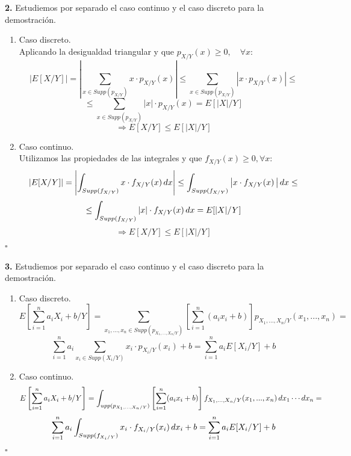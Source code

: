 \documentclass[fleqn]{article}
\newcommand*{\QED}{\hfill\ensuremath{\square}}
\begin{document}
    \textbf{2. } Estudiemos por separado el caso continuo y el caso discreto para la demostración.

    \begin{enumerate}
        \item Caso discreto. \\
                Aplicando la desigualdad triangular y que $p_{X/Y}(x) \geq 0, \quad \forall x:$
                $$\left| E[X/Y] \right| = \left| \sum_{x\in Supp(p_{X/Y})} x\cdot p_{X/Y}(x) \right| \leq   \sum_{x\in Supp(p_{X/Y})} \left| x\cdot p_{X/Y}(x) \right| \leq $$
                $$\leq \sum_{x\in Supp(p_{X/Y})} \left| x \right| \cdot p_{X/Y}(x) = E[|X|/Y]$$
                $$\Rightarrow E[X/Y] \leq E[|X|/Y]$$
        \item Caso continuo. \\
                Utilizamos las propiedades de las integrales y que $f_{X/Y}(x)\geq 0, \forall x :$
                $$\left| E[X/Y] \right| = \left| \int_{Supp(f_{X/Y})} x\cdot f_{X/Y}(x) \thinspace dx \right| \leq  \int_{Supp(f_{X/Y})} \left|x\cdot f_{X/Y}(x) \thinspace \right|dx  \leq$$
                $$\leq \int_{Supp(f_{X/Y})} \left| x \right|\cdot f_{X/Y}(x) \thinspace dx = E[|X|/Y]$$
                $$\Rightarrow E[X/Y] \leq E[|X|/Y]$$
    \end{enumerate}
    \QED \\ \\



    \textbf{3. } Estudiemos por separado el caso continuo y el caso discreto para la demostración.

    \begin{enumerate}
        \item Caso discreto. \\
                $$E\left[\sum_{i=1}^n a_iX_i +b /Y\right] = \sum_{x_1, ..., x_n \in Supp(p_{X_1,...,X_n/Y})} \left[\sum_{i=1}^n (a_ix_i + b)\right]p_{X_1,...,X_n/Y}(x_1,...,x_n) = $$
                $$\sum_{i=1}^n a_i \sum_{x_i \in Supp(X_i/Y)} x_i \cdot p_{X_i/Y}(x_i) + b = \sum_{i=1}^n a_i E[X_i/Y] +b$$
        \item Caso continuo. \\
                $$E\left[\sum_{i=1}^n a_iX_i +b /Y\right] = \int_{ upp(p_{X_1,...,X_n/Y})} \left[\sum_{i=1}^n (a_ix_i + b)\right]f_{X_1,...,X_n/Y}(x_1,...,x_n) \thinspace dx_1 \cdots dx_n= $$
                $$\sum_{i=1}^n a_i \int_{Supp(f_{X_i/Y})} x_i \cdot f_{X_i/Y}(x_i) \thinspace dx_i + b = \sum_{i=1}^n a_i E[X_i/Y] +b$$
    \end{enumerate}
    \QED \\ \\
\end{document}
